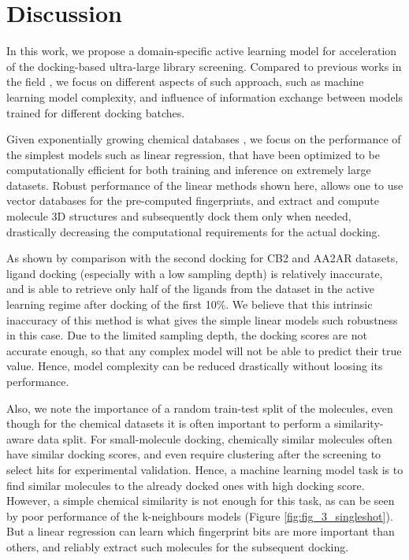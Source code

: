 \section{Discussion}

In this work, we propose a domain-specific active learning model for acceleration of the docking-based ultra-large library screening. Compared to previous works in the field \cite{deepdocking, logistic_regression, Yang2021_shoichet_active_learning, Graff2021AcceleratingLearning}, we focus on different aspects of such approach, such as machine learning model complexity, and influence of information exchange between models trained for different docking batches.

Given exponentially growing chemical databases \cite{warr_exploration_2022, lyu_modeling_2023}, we focus on the performance of the simplest models such as linear regression, that have been optimized to be computationally efficient for both training and inference on extremely large datasets. Robust performance of the linear methods shown here, allows one to use vector databases \cite{noauthor_vector_nodate, noauthor_qdrant_nodate, johnson2019_faiss_vector_database} for the pre-computed fingerprints, and extract and compute molecule 3D structures and subsequently dock them only when needed, drastically decreasing the computational requirements for the actual docking.

As shown by comparison with the second docking for CB2 and AA2AR datasets, ligand docking (especially with a low sampling depth) is relatively inaccurate, and is able to retrieve only half of the ligands from the dataset in the active learning regime after docking of the first 10\%. We believe that this intrinsic inaccuracy of this method is what gives the simple linear models such robustness in this case. Due to the limited sampling depth, the docking scores are not accurate enough, so that any complex model will not be able to predict their true value. Hence, model complexity can be reduced drastically without loosing its performance.

Also, we note the importance of a random train-test split of the molecules, even though for the chemical datasets it is often important to perform a similarity-aware data split. For small-molecule docking, chemically similar molecules often have similar docking scores, and even require clustering after the screening to select hits for experimental validation. Hence, a machine learning model task is to find similar molecules to the already docked ones with high docking score. However, a simple chemical similarity is not enough for this task, as can be seen by poor performance of the k-neighbours models (Figure \ref{fig:fig_3_singleshot}). But a linear regression can learn which fingerprint bits are more important than others, and reliably extract such molecules for the subsequent docking. 

